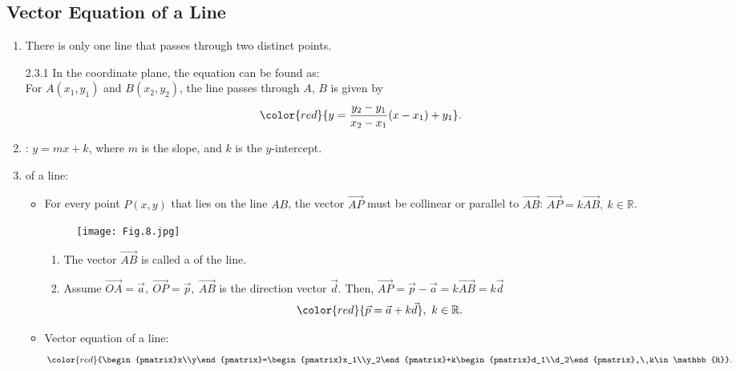 \documentclass[12pt, a4paper]{article}
\def\d{{\mathrm{d}}}
\begin{document}
\subsection{Vector Equation of a Line}
\begin{enumerate}
  \item There is only one line that passes through two distinct points. 
  \begin{theorem}{2.3.1}{}
  In the coordinate plane, the equation can be found as: \\
  For $A(x_1,y_1)$ and $B(x_2,y_2)$, the line passes through $A$, $B$ is given by $${\color{red}{y=\frac{y_2-y_1}{x_2-x_1}(x-x_1)+y_1}}.$$
  \end{theorem}
  \item {}: $y=mx+k$, where $m$ is the slope, and $k$ is the $y$-intercept.\\
  {}
  \item \textbf{\color{red}{Vector form}} of a line: 
  \begin{itemize}
    \item For every point $P(x,y)$ that lies on the line $AB$, the vector $\overrightarrow{AP}$ must be collinear or parallel to $\overrightarrow{AB}$: $\overrightarrow{AP}=k\overrightarrow{AB},\ k\in\mathbb{R}$.
    \begin{figure}[H]
      \centering
      \texttt{[image: Fig.8.jpg]}
    \end{figure}
    \begin{enumerate}
      \item The vector $\overrightarrow{AB}$ is called a \textbf{\color{red}{direction vector}} of the line. \\
      {}
      \item Assume $\overrightarrow{OA}=\vec{a},\ \overrightarrow{OP}=\vec{p},\ \overrightarrow{AB}$ is the direction vector $\vec{d}$. Then, $\overrightarrow{AP}=\vec{p}-\vec{a}=k\overrightarrow{AB}=k\vec{d}$
      $${\color{red}{\vec{p}=\vec{a}+k\vec{d}}},\ k\in\mathbb{R}.$$
    \end{enumerate}
    \item Vector equation of a line: 
    $${\color{red}{\begin{pmatrix}x\\y\end{pmatrix}=\begin{pmatrix}x_1\\y_2\end{pmatrix}+k\begin{pmatrix}d_1\\d_2\end{pmatrix},\ k\in\mathbb{R}}}.$$

\end{itemize}
\end{enumerate}
\end{document}
